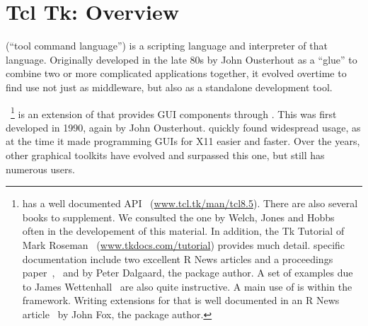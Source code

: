  
\newcommand{\Event}[1]{$<$#1$>$}
\newcommand{\VirtualEvent}[1]{$<<$#1$>>$}



\chapter{Tcl Tk: Overview}
\label{sec:tcltk:overview}





\TCL\/ (``tool command language'') is a scripting language and
interpreter of that language.  Originally developed in the late 80s by
John Ousterhout as a ``glue'' to combine two or more complicated
applications together, it evolved overtime to find use not just as
middleware, but also as a standalone development tool.

\TK~\footnote{
  \Tk{} has a well documented API~\citep{TclTk:Api}
  (\url{www.tcl.tk/man/tcl8.5}).  There are also several books to
  supplement. We consulted the one by Welch, Jones and
  Hobbs~\citep{beedub} often in the developement of this material. In
  addition, the Tk Tutorial of Mark Roseman~\citep{TclTk:Tutorial}
  (\url{www.tkdocs.com/tutorial}) provides much detail. \R{} specific
  documentation include two excellent R News articles and a
  proceedings
  paper~\citep{Rnews:Dalgaard:2001a},~\citep{Rnewse:Dalgaard:2002} and
  \citep{Dalgaard-DSC} by Peter Dalgaard, the package author. A set of
  examples due to James Wettenhall~\citep{Wettenhall} are also quite
  instructive. A main use of  is within the 
  framework. Writing extensions for that is well documented in an R
  News article~\citep{Rnews:Fox:2007} by John Fox, the package author.
} is an extension of \TCL\/ that provides GUI components through \TCL.
This was first developed in 1990, again by John Ousterhout. \TK\/
quickly found widespread usage, as at the time it made programming
GUIs for X11 easier and faster. Over the years, other graphical
toolkits have evolved and surpassed this one, but \TK\/ still has
numerous users.

